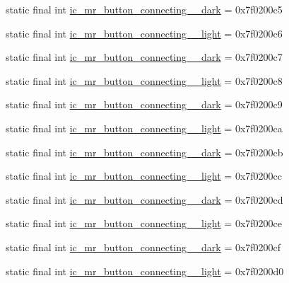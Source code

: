 \begin{CompactItemize}
\item 
static final int \hyperlink{classandroid_1_1support_1_1v7_1_1appcompat_1_1_r_1_1drawable_2c9b944f283c9c983e79b95cace40ba8}{ic\_\-mr\_\-button\_\-connecting\_\_\-dark} = 0x7f0200c5
\item 
static final int \hyperlink{classandroid_1_1support_1_1v7_1_1appcompat_1_1_r_1_1drawable_ad511fc0a80b3871a6943c8c15f9b268}{ic\_\-mr\_\-button\_\-connecting\_\_\-light} = 0x7f0200c6
\item 
static final int \hyperlink{classandroid_1_1support_1_1v7_1_1appcompat_1_1_r_1_1drawable_7a4634f9340bcd57f662dae163ea138d}{ic\_\-mr\_\-button\_\-connecting\_\_\-dark} = 0x7f0200c7
\item 
static final int \hyperlink{classandroid_1_1support_1_1v7_1_1appcompat_1_1_r_1_1drawable_ac3bddc7d3df3e06a375fb6ba19ff496}{ic\_\-mr\_\-button\_\-connecting\_\_\-light} = 0x7f0200c8
\item 
static final int \hyperlink{classandroid_1_1support_1_1v7_1_1appcompat_1_1_r_1_1drawable_374e16a11a10e44c2fbd02b15d9d53d2}{ic\_\-mr\_\-button\_\-connecting\_\_\-dark} = 0x7f0200c9
\item 
static final int \hyperlink{classandroid_1_1support_1_1v7_1_1appcompat_1_1_r_1_1drawable_1adc4918e1101f2afe9c43eb35816bed}{ic\_\-mr\_\-button\_\-connecting\_\_\-light} = 0x7f0200ca
\item 
static final int \hyperlink{classandroid_1_1support_1_1v7_1_1appcompat_1_1_r_1_1drawable_c1c4c1ec346804f51bfad5fa03bdbed8}{ic\_\-mr\_\-button\_\-connecting\_\_\-dark} = 0x7f0200cb
\item 
static final int \hyperlink{classandroid_1_1support_1_1v7_1_1appcompat_1_1_r_1_1drawable_a3e15b4899b6bec9957ff07741371d8c}{ic\_\-mr\_\-button\_\-connecting\_\_\-light} = 0x7f0200cc
\item 
static final int \hyperlink{classandroid_1_1support_1_1v7_1_1appcompat_1_1_r_1_1drawable_8b518c8ab91abd48be180f9c5be97d4f}{ic\_\-mr\_\-button\_\-connecting\_\_\-dark} = 0x7f0200cd
\item 
static final int \hyperlink{classandroid_1_1support_1_1v7_1_1appcompat_1_1_r_1_1drawable_df100c6ce67f186da8161ee8e0f8d000}{ic\_\-mr\_\-button\_\-connecting\_\_\-light} = 0x7f0200ce
\item 
static final int \hyperlink{classandroid_1_1support_1_1v7_1_1appcompat_1_1_r_1_1drawable_0b191b568de38e1a10cf9ecdd95a2b76}{ic\_\-mr\_\-button\_\-connecting\_\_\-dark} = 0x7f0200cf
\item 
static final int \hyperlink{classandroid_1_1support_1_1v7_1_1appcompat_1_1_r_1_1drawable_5ee0075f62dfa616e74e40628519d4e4}{ic\_\-mr\_\-button\_\-connecting\_\_\-light} = 0x7f0200d0

\end{CompactItemize}
